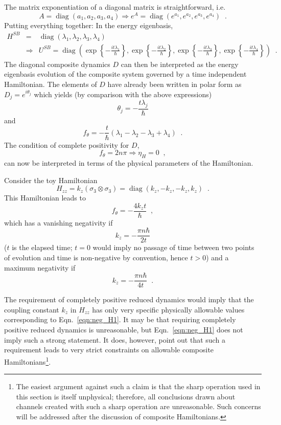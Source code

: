 The matrix exponentiation of a diagonal matrix is straightforward, i.e.\
$$
A=\operatorname{diag}(a_1,a_2,a_3,a_4)\Rightarrow e^A=\operatorname{diag}(e^{a_1},e^{a_2},e^{a_3},e^{a_4})\;\;.
$$
Putting everything together:  In the energy eigenbasis,
\begin{eqnarray*}
H^{SB}&=&\operatorname{diag}(\lambda_1,\lambda_2,\lambda_3,\lambda_4)\\
&\Rightarrow& U^{SB}=\operatorname{diag}\left(\exp{\left\{-\frac{it\lambda_1}{\hbar}\right\}},\exp{\left\{-\frac{it\lambda_2}{\hbar}\right\}},\exp{\left\{-\frac{it\lambda_3}{\hbar}\right\}},\exp{\left\{-\frac{it\lambda_4}{\hbar}\right\}}\right)\;\;.
\end{eqnarray*}
The diagonal composite dynamics $D$ can then be interpreted as the energy eigenbasis evolution of the composite system governed by a time independent Hamiltonian.  The elements of $D$ have already been written in polar form as $D_j=e^{i\theta_j}$ which yields (by comparison with the above expressions)
$$
\theta_j = -\frac{t\lambda_j}{\hbar}
$$
and
\begin{equation}
\label{eqn:ftheta}
f_\theta = -\frac{t}{\hbar}\left(\lambda_1-\lambda_2-\lambda_3+\lambda_4\right)\;\;.
\end{equation}
The condition of complete positivity for $D$,
$$
f_\theta = 2n\pi \Rightarrow \eta_H = 0\;\;,
$$
can now be interpreted in terms of the physical parameters of the Hamiltonian.

\begin{example}
Consider the toy Hamiltonian
$$
H_{zz} = k_z \left(\sigma_3\otimes\sigma_3\right) = \operatorname{diag}(k_z,-k_z,-k_z,k_z)\;\;.
$$
This Hamiltonian leads to
$$
f_\theta = -\frac{4k_zt}{\hbar}\;\;,
$$
which has a vanishing negativity if
\begin{equation}
\label{eqn:neg_H1}
k_z = -\frac{\pi n \hbar}{2t}
\end{equation}
($t$ is the elapsed time; $t=0$ would imply no passage of time between two points of evolution and time is non-negative by convention, hence $t>0$) and a maximum negativity if
$$
k_z = -\frac{\pi n \hbar}{4t}\;\;.
$$
\end{example}

The requirement of completely positive reduced dynamics would imply that the coupling constant $k_z$ in $H_{zz}$ has only very specific physically allowable values corresponding to Eqn.\ \ref{eqn:neg_H1}.  It may be that requiring completely positive reduced dynamics is unreasonable, but Eqn.\ \ref{eqn:neg_H1} does not imply such a strong statement.  It does, however, point out that such a requirement leads to very strict constraints on allowable composite Hamiltonians\footnote{The easiest argument against such a claim is that the sharp operation used in this section is itself unphysical; therefore, all conclusions drawn about channels created with such a sharp operation are unreasonable.  Such concerns will be addressed after the discussion of composite Hamiltonians.}.  

